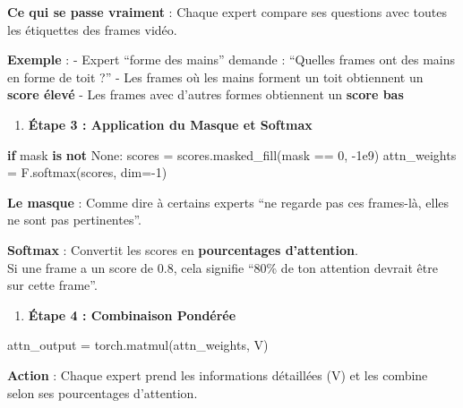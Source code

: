 \documentclass[12pt]{article}
\providecommand{\tightlist}{%
      \setlength{\itemsep}{0pt}\setlength{\parskip}{0pt}}
\newenvironment{Shaded}{}{}
\newcommand{\KeywordTok}[1]{\textcolor[rgb]{0.00,0.44,0.13}{\textbf{{#1}}}}
\newcommand{\DecValTok}[1]{\textcolor[rgb]{0.25,0.63,0.44}{{#1}}}
\newcommand{\FloatTok}[1]{\textcolor[rgb]{0.25,0.63,0.44}{{#1}}}
\newcommand{\NormalTok}[1]{{#1}}
\newcommand{\VariableTok}[1]{\textcolor[rgb]{0.10,0.09,0.49}{{#1}}}
\newcommand{\ControlFlowTok}[1]{\textcolor[rgb]{0.00,0.44,0.13}{\textbf{{#1}}}}
\newcommand{\OperatorTok}[1]{\textcolor[rgb]{0.40,0.40,0.40}{{#1}}}
\begin{document}
\textbf{Ce qui se passe vraiment} : Chaque expert compare ses questions
avec toutes les étiquettes des frames vidéo.

\textbf{Exemple} : - Expert ``forme des mains'' demande : ``Quelles
frames ont des mains en forme de toit ?'' - Les frames où les mains
forment un toit obtiennent un \textbf{score élevé} - Les frames avec
d'autres formes obtiennent un \textbf{score bas}

\begin{enumerate}
\def\labelenumi{\arabic{enumi}.}
\setcounter{enumi}{2}
\tightlist
\item
  \textbf{Étape 3 : Application du Masque et Softmax}
\end{enumerate}

\begin{Shaded}
\begin{Highlighting}[]
\ControlFlowTok{if}\NormalTok{ mask }\KeywordTok{is} \KeywordTok{not} \VariableTok{None}\NormalTok{:}
\NormalTok{    scores }\OperatorTok{=}\NormalTok{ scores.masked\_fill(mask }\OperatorTok{==} \DecValTok{0}\NormalTok{, }\OperatorTok{{-}}\FloatTok{1e9}\NormalTok{)}
\NormalTok{attn\_weights }\OperatorTok{=}\NormalTok{ F.softmax(scores, dim}\OperatorTok{={-}}\DecValTok{1}\NormalTok{)}
\end{Highlighting}
\end{Shaded}

\textbf{Le masque} : Comme dire à certains experts ``ne regarde pas ces
frames-là, elles ne sont pas pertinentes''.

\textbf{Softmax} : Convertit les scores en \textbf{pourcentages
d'attention}.\\
Si une frame a un score de 0.8, cela signifie ``80\% de ton attention
devrait être sur cette frame''.

\begin{enumerate}
\def\labelenumi{\arabic{enumi}.}
\setcounter{enumi}{3}
\tightlist
\item
  \textbf{Étape 4 : Combinaison Pondérée}
\end{enumerate}

\begin{Shaded}
\begin{Highlighting}[]
\NormalTok{attn\_output }\OperatorTok{=}\NormalTok{ torch.matmul(attn\_weights, V)}
\end{Highlighting}
\end{Shaded}

\textbf{Action} : Chaque expert prend les informations détaillées (V) et
les combine selon ses pourcentages d'attention.
\end{document}
